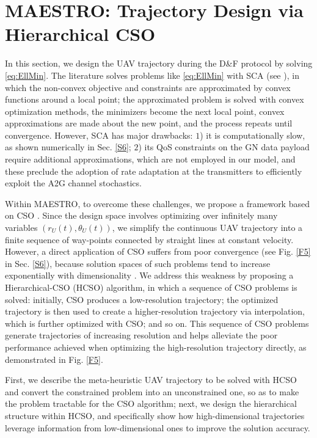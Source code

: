 \documentclass[12pt, draftcls, onecolumn]{IEEEtran}
\theoremstyle{plain}
\theoremstyle{definition}
\theoremstyle{remark}
\begin{document}
\section{MAESTRO: Trajectory Design via Hierarchical CSO}\label{S4}
\vspace{-2mm}

In this section, we design the UAV trajectory during the D\&F protocol by solving \eqref{eq:EllMin}. The literature solves problems like \eqref{eq:EllMin} with SCA (see \cite{SCA, CSCA-ADMM, EnergyEfficientUAVs}), in which the non-convex objective and constraints are approximated by convex functions around a local point; the approximated problem is solved with convex optimization methods, the minimizers become the next local point, convex approximations are made about the new point, and the process repeats until convergence. However, SCA has major drawbacks: $1$) it is computationally slow, as shown numerically in Sec. \ref{S6}; $2$) its QoS constraints on the GN data payload require additional approximations, which are not employed in our model, and these preclude the adoption of rate adaptation at the transmitters to efficiently exploit the A2G channel stochastics.

Within MAESTRO, to overcome these challenges, we propose a framework based on CSO \cite{CSO}. Since the design space involves optimizing over infinitely many variables $(r_{U}(t),\theta_{U}(t))$, we simplify the continuous UAV trajectory into a finite sequence of way-points connected by straight lines at constant velocity. However, a direct application of CSO suffers from poor convergence (see Fig. \ref{F5} in Sec. \ref{S6}), because solution spaces of such problems tend to increase exponentially with dimensionality \cite{HighDimensionality}. We address this weakness by proposing a Hierarchical-CSO (HCSO) algorithm, in which a sequence of CSO problems is solved: initially, CSO produces a low-resolution trajectory; the optimized trajectory is then used to create a higher-resolution trajectory via interpolation, which is further optimized with CSO; and so on. This sequence of CSO problems generate trajectories of increasing resolution and helps alleviate the poor performance achieved when optimizing the high-resolution trajectory directly, as demonstrated in Fig. \ref{F5}.

First, we describe the meta-heuristic UAV trajectory to be solved with HCSO and convert the constrained problem into an unconstrained one, so as to make the problem tractable for the CSO algorithm; next, we design the hierarchical structure within HCSO, and specifically show how high-dimensional trajectories leverage information from low-dimensional ones to improve the solution accuracy.
\end{document}
